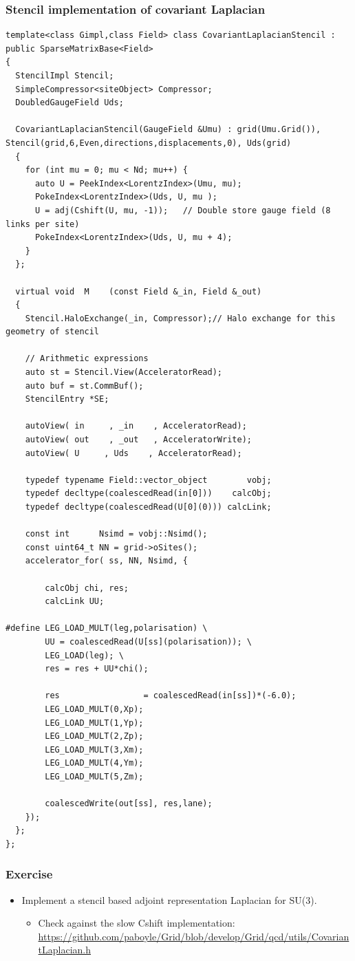 \documentclass[pdf,ps,8pt]{beamer}
\newcommand{\miniscule}{\fontsize{3pt}{4pt}\selectfont}
\newcommand{\link}[1]{\href{#1}{ {\color{blue} #1} }}
\begin{document}
\begin{frame}[fragile]\small\frametitle{ Stencil implementation of covariant Laplacian}
{\miniscule
\begin{verbatim}
template<class Gimpl,class Field> class CovariantLaplacianStencil : public SparseMatrixBase<Field>
{
  StencilImpl Stencil;
  SimpleCompressor<siteObject> Compressor;
  DoubledGaugeField Uds;

  CovariantLaplacianStencil(GaugeField &Umu) : grid(Umu.Grid()), Stencil(grid,6,Even,directions,displacements,0), Uds(grid)
  {
    for (int mu = 0; mu < Nd; mu++) {
      auto U = PeekIndex<LorentzIndex>(Umu, mu);
      PokeIndex<LorentzIndex>(Uds, U, mu );
      U = adj(Cshift(U, mu, -1));   // Double store gauge field (8 links per site)
      PokeIndex<LorentzIndex>(Uds, U, mu + 4);
    }
  };

  virtual void  M    (const Field &_in, Field &_out)
  {
    Stencil.HaloExchange(_in, Compressor);// Halo exchange for this geometry of stencil

    // Arithmetic expressions
    auto st = Stencil.View(AcceleratorRead);
    auto buf = st.CommBuf();
    StencilEntry *SE;

    autoView( in     , _in    , AcceleratorRead);
    autoView( out    , _out   , AcceleratorWrite);
    autoView( U     , Uds    , AcceleratorRead);

    typedef typename Field::vector_object        vobj;
    typedef decltype(coalescedRead(in[0]))    calcObj;
    typedef decltype(coalescedRead(U[0](0))) calcLink;

    const int      Nsimd = vobj::Nsimd();
    const uint64_t NN = grid->oSites();
    accelerator_for( ss, NN, Nsimd, {

        calcObj chi, res;
        calcLink UU;

#define LEG_LOAD_MULT(leg,polarisation)	\
        UU = coalescedRead(U[ss](polarisation)); \
        LEG_LOAD(leg); \
        res = res + UU*chi();			        
	
        res                 = coalescedRead(in[ss])*(-6.0);
        LEG_LOAD_MULT(0,Xp);
        LEG_LOAD_MULT(1,Yp);
        LEG_LOAD_MULT(2,Zp);
        LEG_LOAD_MULT(3,Xm);
        LEG_LOAD_MULT(4,Ym);
        LEG_LOAD_MULT(5,Zm);

        coalescedWrite(out[ss], res,lane);
    });
  };
};
\end{verbatim}
}
\end{frame}


\begin{frame}[fragile]\small\frametitle{ Exercise}

\begin{itemize}
\item Implement a stencil based adjoint representation Laplacian for SU(3).
\begin{itemize}
\item Check against the slow Cshift implementation: \link{https://github.com/paboyle/Grid/blob/develop/Grid/qcd/utils/CovariantLaplacian.h}
\end{itemize}
\end{itemize}

\end{frame}
\end{document}
